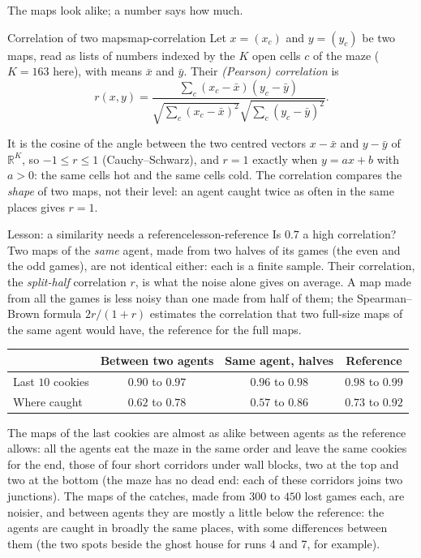 The maps look alike; a number says how much.

\begin{definition}{Correlation of two maps}{map-correlation}
  Let $x = (x_c)$ and $y = (y_c)$ be two maps, read as lists of numbers
  indexed by the $K$ open cells $c$ of the maze ($K = 163$ here), with means
  $\bar x$ and $\bar y$. Their \emph{(Pearson) correlation} is
  \begin{equation}
    r(x, y) = \frac{\sum_c (x_c - \bar x)(y_c - \bar y)}
      {\sqrt{\sum_c (x_c - \bar x)^2} \sqrt{\sum_c (y_c - \bar y)^2}}.
  \end{equation}
\end{definition}

It is the cosine of the angle between the two centred vectors
$x - \bar x$ and $y - \bar y$ of $\mathbb{R}^K$, so $-1 \le r \le 1$
(Cauchy--Schwarz), and $r = 1$ exactly when $y = a x + b$ with $a > 0$: the
same cells hot and the same cells cold. The correlation compares the
\emph{shape} of two maps, not their level: an agent caught twice as often in
the same places gives $r = 1$.

\begin{remark}{Lesson: a similarity needs a reference}{lesson-reference}
  Is $0.7$ a high correlation? Two maps of the \emph{same} agent, made from
  two halves of its games (the even and the odd games), are not identical
  either: each is a finite sample. Their correlation, the \emph{split-half}
  correlation $r$, is what the noise alone gives on average. A map made
  from all the games is less noisy than one made from half of them; the
  Spearman--Brown formula $2r / (1 + r)$ estimates the correlation that two
  full-size maps of the same agent would have, the reference for the full
  maps.
\end{remark}

\begin{center}
  \begin{tabular}{@{}lccc@{}}
    \toprule
    & Between two agents & Same agent, halves & Reference \\
    \midrule
    Last $10$ cookies & $0.90$ to $0.97$ & $0.96$ to $0.98$
      & $0.98$ to $0.99$ \\
    Where caught & $0.62$ to $0.78$ & $0.57$ to $0.86$
      & $0.73$ to $0.92$ \\
    \bottomrule
  \end{tabular}
\end{center}

The maps of the last cookies are almost as alike between agents as the
reference allows: all the agents eat the maze in the same order and leave
the same cookies for the end, those of four short corridors under wall
blocks, two at the top and two at the bottom (the maze has no dead end:
each of these corridors joins two junctions). The maps of the catches,
made from $300$ to $450$ lost games each, are noisier, and between agents
they are mostly a little below the reference: the agents are caught in
broadly the same places, with some differences between them (the two
spots beside the ghost house for runs 4 and 7, for example).

